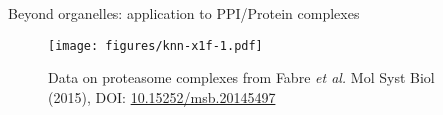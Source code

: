 \begin{frame}{Beyond organelles: application to PPI/Protein complexes}

  \begin{figure}[t]
    \texttt{[image: figures/knn-x1f-1.pdf]}
    \caption{Data on proteasome complexes from Fabre \textit{et
        al.}  Mol Syst Biol (2015), DOI:
      \url{10.15252/msb.20145497}}
  \end{figure}

\end{frame}


